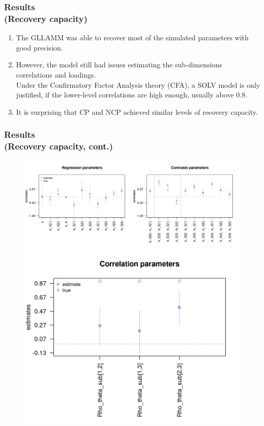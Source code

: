 \documentclass[arial,12pt,xcolor=dvipsnames]{beamer}
\begin{document}
\begin{frame}
	\frametitle{Results \\
		(Recovery capacity)}
	\begin{enumerate}
		\item The GLLAMM was able to recover most of the simulated parameters with good precision.
		\item However, the model still had issues estimating the sub-dimensions correlations and loadings.\\
		\vspace{0.3cm} Under the Confirmatory Factor Analysis theory (CFA), a SOLV model is only justified, if the lower-level correlations are high enough, usually above 0.8.
		\item It is surprising that CP and NCP achieved similar levels of recovery capacity.
	\end{enumerate} 
\end{frame}
%
\begin{frame}
	\frametitle{Results \\
		(Recovery capacity, cont.)}
	\begin{figure}[H]
		\centering
			\includegraphics[width=0.8\linewidth]{FOLV_NC_J100_Ndata1_regression}
			\includegraphics[width=0.45\linewidth]{FOLV_NC_J100_Ndata1_corr}
		\label{fig:FOLV_NC_recovery1}
	\end{figure} 
\end{frame}
\end{document}

